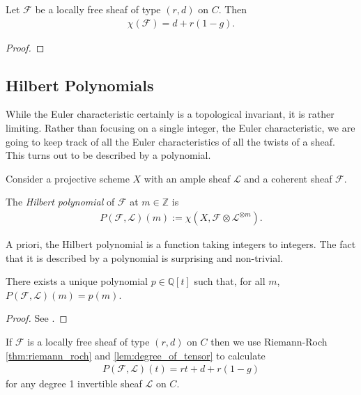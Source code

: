 \documentclass[12pt]{ociamthesis}  %
\begin{document}
\begin{theorem}\label{thm:riemann_roch}
  Let $\mathscr F$ be a locally free sheaf of type $(r,d)$
  on $C$. Then
  \begin{align*}
    \chi(\mathscr F) = d + r(1-g).
  \end{align*}
  \begin{proof}
    \missingproof
  \end{proof}
\end{theorem}
\subsection{Hilbert Polynomials}

While the Euler characteristic certainly is a topological invariant,
it is rather limiting. Rather than focusing on a single integer,
the Euler characteristic,
we are going to keep track of all the Euler characteristics of all
the twists of a sheaf. This turns out to be described by a polynomial.

Consider a projective scheme $X$ with an ample sheaf $\mathscr L$
and a coherent sheaf $\mathscr F$.

\begin{definition}
  The \emph{Hilbert polynomial} of $\mathscr F$ at $m\in\mathbb{Z}$
  is
  \begin{align*}
    P(\mathscr F,\mathscr L)(m) := \chi(X,\mathscr F \otimes \mathscr L^{\otimes m}).
  \end{align*}
\end{definition}

A priori, the Hilbert polynomial is a function taking integers to
integers. The fact that it is described by a polynomial is
surprising and non-trivial.

\begin{lemma}
  There exists a unique polynomial $p\in\mathbb{Q}[t]$ such that,
  for all $m$, $P(\mathscr F,\mathscr L)(m) = p(m)$.
  \begin{proof}
    See \cite[Lemma 1.2.1]{huybrechts2010}.
  \end{proof}
\end{lemma}

\begin{example}\label{ex:hilbert_polynomial}
  If $\mathscr F$ is a locally free sheaf of type $(r,d)$
  on $C$ then we use Riemann-Roch \ref{thm:riemann_roch} and
  \ref{lem:degree_of_tensor} to calculate
  \begin{align*}
    P(\mathscr F, \mathscr L)(t) = rt + d + r(1-g)
  \end{align*}
  for any degree 1 invertible sheaf $\mathscr L$ on $C$.
\end{example}
\end{document}
